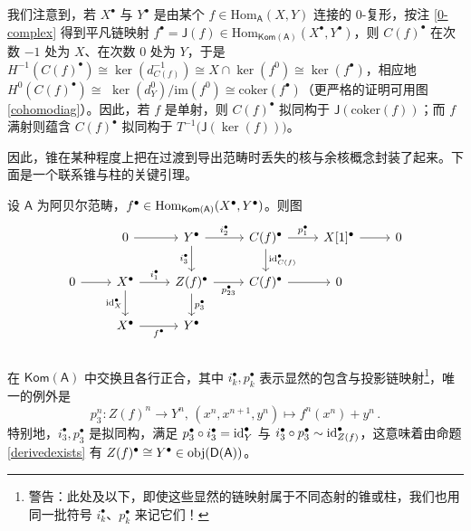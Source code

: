 
我们注意到，若 $X^\bullet$ 与 $Y^\bullet$ 是由某个 $f\in\text{Hom}_\mathsf{A}(X,Y)$ 连接的 0-复形，按注 \ref{0-complex} 得到平凡链映射 $f^\bullet=\mathsf{J}(f)\in\text{Hom}_\mathsf{Kom(A)}(X^\bullet,Y^\bullet)$，则 $C(f)^\bullet$ 在次数 $-1$ 处为 $X$、在次数 0 处为 $Y$，于是 $H^{-1}(C(f)^\bullet)\cong\ker(d_{C(f)}^{-1})\cong X\cap\ker(f^0)\cong \ker(f^\bullet)$，相应地 $H^0(C(f)^\bullet)\cong$ $\ker(d_Y^0)/\text{im}(f^0)\cong\text{coker}(f^\bullet)$（更严格的证明可用图 \eqref{cohomodiag}）。因此，若 $f$ 是单射，则 $C(f)^\bullet$ 拟同构于 $\mathsf{J}(\text{coker}(f))$；而 $f$ 满射则蕴含 $C(f)^\bullet$ 拟同构于 $T^{-1}\big(\mathsf{J}(\ker(f))\big)$。

因此，锥在某种程度上把在过渡到导出范畴时丢失的核与余核概念封装了起来。下面是一个联系锥与柱的关键引理。

\begin{Lem}\label{p3i3quiso}
	设 $\mathsf{A}$ 为阿贝尔范畴，$f^\bullet\in\textup{Hom}_\mathsf{Kom(A)}(X^\bullet, Y^\bullet)$。则图
	\begin{equation}\label{distinguidiag}
		\begin{tikzcd}
			& 0\arrow[r] & Y^\bullet\arrow[r, "i_2^\bullet"]\arrow[d, "i_3^\bullet"'] & C(f)^\bullet\arrow[r, "p_1^\bullet"]\arrow[d, "{\textup{id}_{C(f)}^\bullet}"] & X[1]^\bullet\arrow[r] & 0 \\
			0\arrow[r] & X^\bullet\arrow[r, "{i_1^\bullet}"]\arrow[d, "{\textup{id}_X^\bullet}"'] & Z(f)^\bullet\arrow[r, "p_{23}^\bullet"']\arrow[d, "p_3^\bullet"] & C(f)^\bullet\arrow[r] & 0 & \\
			& X^\bullet\arrow[r, "f^\bullet"'] & Y^\bullet & & & \\
		\end{tikzcd}\vspace*{-0.3cm}
	\end{equation}
	在 $\mathsf{Kom(A)}$ 中交换且各行正合，其中 $i_k^\bullet, p_k^\bullet$ 表示显然的包含与投影链映射\footnote{警告：此处及以下，即使这些显然的链映射属于不同态射的锥或柱，我们也用同一批符号 $i_k^\bullet$、$p_k^\bullet$ 来记它们！}，唯一的例外是 
	\[
	p_3^n:Z(f)^n\rightarrow Y^n,\,(x^n,x^{n+1},y^n)\mapsto f^n(x^n)+y^n\,.
	\]
	特别地，$i_3^\bullet, p_3^\bullet$ 是拟同构，满足 $p_3^\bullet\circ i_3^\bullet=\textup{id}_Y^\bullet$ 与 $i_3^\bullet\circ p_3^\bullet\sim\textup{id}_{Z(f)}^\bullet$，这意味着由命题 \ref{derivedexists} 有 $Z(f)^\bullet\cong Y^\bullet\in\textup{obj}(\mathsf{D(A)})$。 
\end{Lem} 

